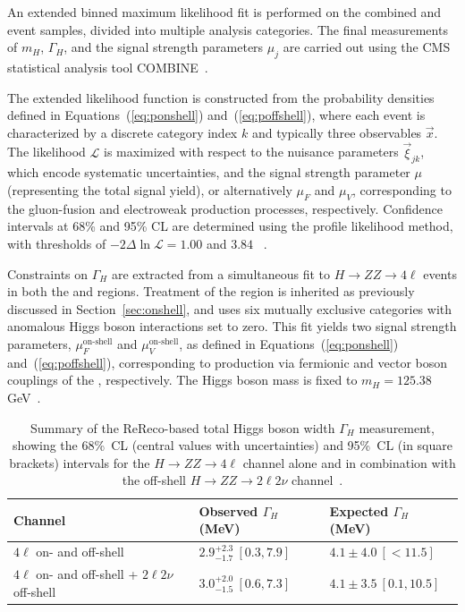 An extended binned maximum likelihood fit is performed on the combined \onshell and \offshell event samples, divided into multiple analysis categories. The final measurements of $m_H$, $\Gamma_H$, and the signal strength parameters $\mu_{j}$ are carried out using the CMS statistical analysis tool COMBINE~\cite{CMS:2024onh}.

The extended likelihood function is constructed from the probability densities defined in Equations~(\ref{eq:ponshell}) and~(\ref{eq:poffshell}), where each event is characterized by a discrete category index $k$ and typically three observables $\vec{x}$. The likelihood $\mathcal{L}$ is maximized with respect to the nuisance parameters $\vec{\xi}_{jk}$, which encode systematic uncertainties, and the signal strength parameter $\mu$ (representing the total signal yield), or alternatively $\mu_F$ and $\mu_V$, corresponding to the gluon-fusion and electroweak production processes, respectively. Confidence intervals at 68\% and 95\% CL are determined using the profile likelihood method, with thresholds of $-2\Delta\ln\mathcal{L} = 1.00$ and $3.84$ ~\cite{Wilks:1938dza}.

Constraints on $\Gamma_H$ are extracted from a simultaneous fit to $H \to ZZ \to 4\ell$ events in both the \onshell and \offshell regions. Treatment of the \onshell region is inherited as previously discussed in Section~\ref{sec:onshell}, and uses six mutually exclusive categories with anomalous Higgs boson interactions set to zero. This fit yields two signal strength parameters, $\mu^\text{on-shell}_{F}$ and $\mu^\text{on-shell}_{V}$, as defined in Equations~(\ref{eq:ponshell}) and~(\ref{eq:poffshell}), corresponding to production via fermionic and vector boson couplings of the \Hboson, respectively. The Higgs boson mass is fixed to $m_H = 125.38$\,GeV~\cite{Sirunyan:2020xwk}.

\begin{table}[!thb]
    \centering
    \begin{tabular}{lll}
        Channel     & Observed $\Gamma_H$ (MeV)        &  Expected $\Gamma_H$ (MeV)  \\
        \hline
        $4\ell$ on- and off-shell    & $2.9^{+2.3}_{-1.7} \ [0.3,7.9]$ & $4.1\pm 4.0 \ [<11.5 ]$ \\
        $4\ell$ on- and off-shell  + $2\ell2\nu$ off-shell  & $3.0^{+ 2.0 }_{- 1.5 }  \ [0.6, 7.3]$ & $4.1\pm3.5 \ [0.1,10.5]$ \\
    \end{tabular}
    \caption{Summary of the ReReco-based total Higgs boson width $\Gamma_H$ measurement, showing the 68\%~CL (central values with uncertainties)
    and 95\%~CL (in square brackets) intervals for the $H \to ZZ \to 4 \ell$ channel alone and in combination with the off-shell $H \to ZZ \to 2 \ell 2 \nu$ channel~\cite{PhysRevD.111.092014}.}
    \label{table:widthoffshellcomb}
\end{table}

